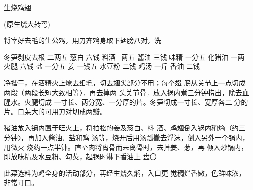 \begin{recipe}{生烧鸡翅}

(原生烧大转弯)

\ingredients



\cooking

\step 将宰好去毛的生公鸡，用刀齐鸡身取下翅膀八对，洗

冬笋剥皮去根	二两五	葱白	六钱
料酒	~两五	酱油	三钱
味精	一分五	化猪油	一两
火腿	六钱	盐	一分五
姜	一钱五	水豆粉	二钱
鸡汤	一斤	香油	二钱

净揩干，在酒精火上燎去细毛，切去翅尖部分不用；每个翅 膀从关节上一点切成两段（两段长短大致相等〉，再去掉两 头关节骨，放入锅内煮三分钟捞出，除去血腥水。火腿切成 一寸长、两分宽、一分厚的片。冬笋切成一寸长、宽厚各二 分的片。口茉大的可用刀对切成两瓣。

\step 猪油放入锅内置于旺火上，将拍松的姜及葱白、料 酒、鸡翅倒入锅内稍熵（约三分钟〉，再加入酱油、盐和鸡 汤等，烧开后用汤瓢撇去浮沫，倒入另外一个锅内，用微火 烧约一点半钟。直至肉将离骨而未离骨时，去掉姜、葱，再 倾入炒锅内，即放味精及水豆粉、勾芡，起锅时淋下香油上 盘〇

\notes

此菜选料为鸡全身的活动部分，再经生烧久焖，入口更 觉稠烂香嫩，色鲜味浓，非常可口。

\end{recipe}

